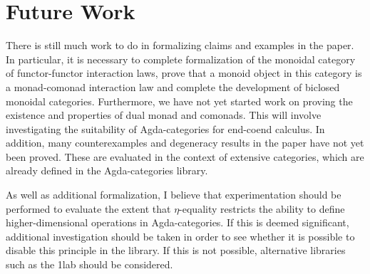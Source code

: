 \documentclass{amsart}
\theoremstyle{remark}
\begin{document}
\section{Future Work}
There is still much work to do in formalizing claims and examples in the paper. In particular, it is necessary to complete formalization of the monoidal category of functor-functor interaction laws, prove that a monoid object in this category is a monad-comonad interaction law and complete the development of biclosed monoidal categories. Furthermore, we have not yet started work on proving the existence and properties of dual monad and comonads. This will involve investigating the suitability of Agda-categories for end-coend calculus. In addition, many counterexamples and degeneracy results in the paper have not yet been proved. These are evaluated in the context of extensive categories, which are already defined in the Agda-categories library.

As well as additional formalization, I believe that experimentation should be performed to evaluate the extent that $\eta$-equality restricts the ability to define higher-dimensional operations in Agda-categories. If this is deemed significant, additional investigation should be taken in order to see whether it is possible to disable this principle in the library. If this is not possible, alternative libraries such as the 1lab should be considered.
 

\printbibliography
\end{document}
